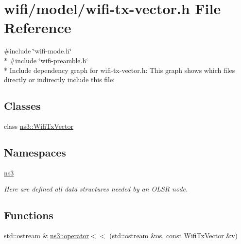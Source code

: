 \hypertarget{wifi-tx-vector_8h}{}\section{wifi/model/wifi-\/tx-\/vector.h File Reference}
\label{wifi-tx-vector_8h}
{\ttfamily \#include \char`\"{}wifi-\/mode.\+h\char`\"{}}\\*
{\ttfamily \#include \char`\"{}wifi-\/preamble.\+h\char`\"{}}\\*
Include dependency graph for wifi-\/tx-\/vector.h\+:
This graph shows which files directly or indirectly include this file\+:
\subsection*{Classes}
\begin{DoxyCompactItemize}
\item 
class \hyperlink{classns3_1_1WifiTxVector}{ns3\+::\+Wifi\+Tx\+Vector}
\end{DoxyCompactItemize}
\subsection*{Namespaces}
\begin{DoxyCompactItemize}
\item 
 \hyperlink{namespacens3}{ns3}
\begin{DoxyCompactList}\small\item\em Here are defined all data structures needed by an O\+L\+SR node. \end{DoxyCompactList}\end{DoxyCompactItemize}
\subsection*{Functions}
\begin{DoxyCompactItemize}
\item 
std\+::ostream \& \hyperlink{namespacens3_a3a8fb206e33137628bb0105dac8bbf33}{ns3\+::operator$<$$<$} (std\+::ostream \&os, const Wifi\+Tx\+Vector \&v)
\end{DoxyCompactItemize}
